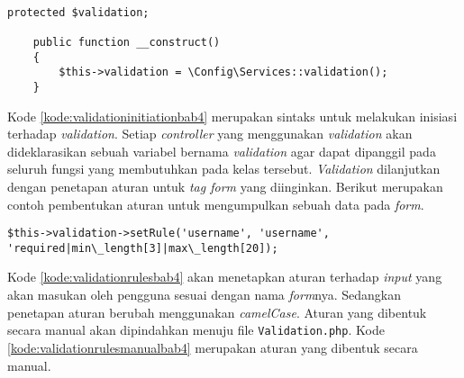 \begin{lstlisting}[caption=Perancangan inisiasi \textit{validation} pada \texttt{\_\_construct}, label=kode:validationinitiationbab4]

protected $validation;

	public function __construct()
	{
		$this->validation = \Config\Services::validation();
	}
\end{lstlisting}

Kode \ref{kode:validationinitiationbab4} merupakan sintaks untuk melakukan inisiasi terhadap \textit{validation}. Setiap \textit{controller} yang menggunakan \textit{validation} akan dideklarasikan sebuah variabel bernama \textit{validation} agar dapat dipanggil pada seluruh fungsi yang membutuhkan pada kelas tersebut. \textit{Validation} dilanjutkan dengan penetapan aturan untuk \textit{tag form} yang diinginkan. Berikut merupakan contoh pembentukan aturan untuk mengumpulkan sebuah data pada \textit{form}.

\begin{lstlisting}[caption=Perancangan perubahan konfigurasi aturan pada \textit{library validation}, label=kode:validationrulesbab4]
$this->validation->setRule('username', 'username', 'required|min\_length[3]|max\_length[20]);
\end{lstlisting}

Kode \ref{kode:validationrulesbab4} akan menetapkan aturan terhadap \textit{input} yang akan masukan oleh pengguna sesuai dengan nama \textit{form}nya. Sedangkan penetapan aturan berubah menggunakan \textit{camelCase}. Aturan yang dibentuk secara manual akan dipindahkan menuju file \texttt{Validation.php}. Kode \ref{kode:validationrulesmanualbab4} merupakan aturan yang dibentuk secara manual.

